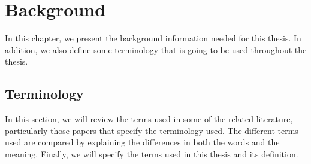 \chapter{Background}\label{ch:Background}
In this chapter, we present the background information needed for this thesis. In addition, we also define some terminology that is going to be used throughout the thesis.

\section{Terminology}
In this section, we will review the terms used in some of the related literature, particularly those papers that specify the terminology used. The different terms used are compared by explaining the differences in both the words and the meaning. Finally, we will specify the terms used in this thesis and its definition.

